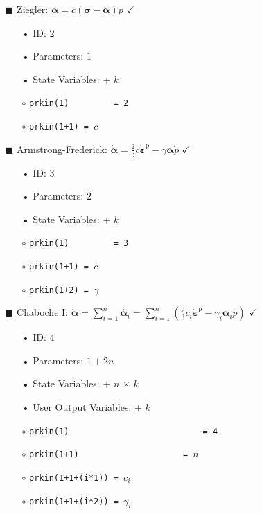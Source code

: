 \documentclass[11pt,a4paper,twoside,final,onecolumn,titlepage]{article}
\newcommand{\verified}{\hspace{0.5pt} {\LARGE $\checkmark$}}
\begin{document}
\pagebreak
\begin{itemize}
	\item[\tiny$\blacksquare$] Ziegler: $\displaystyle \dot{\bm{\alpha}}=c\left(\bm{\sigma}-\bm{\alpha}\right)\dot{p}$ \verified{}
	\begin{itemize}
		\item[•] ID: $2$
		\item[•] Parameters: $1$
		\item[•] State Variables: + $k$\\
		\item[$\circ$] \texttt{prkin(1)\,\,\,\,\,\,\,\,\,= 2}
		\item[$\circ$] \texttt{prkin(1+1) = $c$}\\
	\end{itemize}
\end{itemize}

\begin{itemize}
	\item[\tiny$\blacksquare$] Armstrong-Frederick: $\displaystyle \dot{\bm{\alpha}}=\frac{2}{3}c\dot{\bm{\varepsilon}}^\textrm{p} -\gamma\bm{\alpha}\dot{p}$ \verified{}
	\begin{itemize}
		\item[•] ID: $3$
		\item[•] Parameters: $2$
		\item[•] State Variables: + $k$\\
		\item[$\circ$] \texttt{prkin(1)\,\,\,\,\,\,\,\,\,= 3}
		\item[$\circ$] \texttt{prkin(1+1) = $c$}
		\item[$\circ$] \texttt{prkin(1+2) = $\gamma$}\\
	\end{itemize}
\end{itemize}

\begin{itemize}
	\item[\tiny$\blacksquare$] Chaboche I: $\displaystyle \dot{\bm{\alpha}}=\sum_{i=1}^{n}\dot{\bm{\alpha}_i}=\sum_{i=1}^{n}\left(\frac{2}{3}c_i\dot{\bm{\varepsilon}}^\textrm{p} -\gamma_{i}\bm{\alpha}_i\dot{p}\right)$ \verified{}
	\begin{itemize}
		\item[•] ID: $4$
		\item[•] Parameters: $1+2n$
		\item[•] State Variables: + $n$ $\times$ $k$
		\item[•] User Output Variables: + $k$\\
		\item[$\circ$] \texttt{prkin(1)\,\,\,\,\,\,\,\,\,\,\,\,\,\,\,\,\,\,\,\,\,\,\,\,\,\,\,= 4}
		\item[$\circ$] \texttt{prkin(1+1)\,\,\,\,\,\,\,\,\,\,\,\,\,\,\,\,\,\,\,\,\,= $n$}
		\item[$\circ$] \texttt{prkin(1+1+(i*1)) = $c_i$}
		\item[$\circ$] \texttt{prkin(1+1+(i*2)) = $\gamma_i$}\\
	\end{itemize}
\end{itemize}
\end{document}
